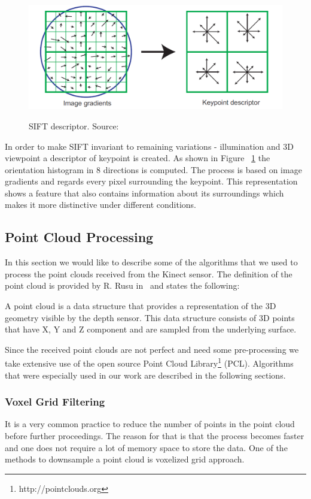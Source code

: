 \begin{figure}
\centering

{\includegraphics[width=0.8\columnwidth]{figures/sift.png}}

\caption{SIFT descriptor. Source:~\cite{lowe2004distinctive}}
\label{fig:sift}
\end{figure}

In order to make SIFT invariant to remaining variations - illumination and 3D viewpoint a descriptor of keypoint is created. As shown in Figure ~\ref{fig:sift} the orientation histogram in 8 directions is computed. The process is based on image gradients and regards every pixel surrounding the keypoint. This representation shows a feature that also contains information about its surroundings which makes it more distinctive under different conditions.


\subsection{Point Cloud Processing}
In this section we would like to describe some of the algorithms that we used to process the point clouds received from the Kinect sensor. The definition of the point cloud is provided by R. Rusu in~\cite{Rusu_ICRA2011_PCL} and states the following:

A point cloud is a data structure that provides a representation of the 3D geometry visible by the depth sensor. This data structure consists of 3D points that have X, Y and Z component and are sampled from the underlying surface.  

Since the received point clouds are not perfect and need some pre-processing we take extensive use of the open source Point Cloud Library\footnote{http://pointclouds.org} (PCL). Algorithms that were especially used in our work are described in the following sections.

\subsubsection{Voxel Grid Filtering}
It is a very common practice to reduce the number of points in the point cloud before further proceedings. The reason for that is that the process becomes faster and one does not require a lot of memory space to store the data. One of the methods to downsample a point cloud is voxelized grid approach.

